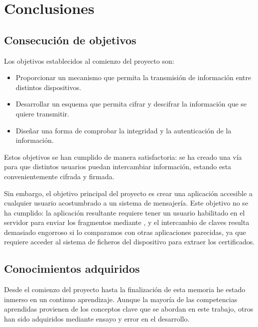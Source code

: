 
\chapter{Conclusiones} %

\label{Chapter6} %


\section{Consecución de objetivos}

Los objetivos establecidos al comienzo del proyecto son:

\begin{itemize}
  \item Proporcionar un mecanismo que permita la transmisión de información entre distintos dispositivos.
  \item Desarrollar un esquema que permita cifrar y descifrar la información que se quiere transmitir.
  \item Diseñar una forma de comprobar la integridad y la autenticación de la información.
\end{itemize}

Estos objetivos se han cumplido de manera satisfactoria: se ha creado una vía para que distintos usuarios puedan intercambiar información, estando esta convenientemente cifrada y firmada.

Sin embargo, el objetivo principal del proyecto es crear una aplicación accesible a cualquier usuario acostumbrado a un sistema de mensajería. Este objetivo no se ha cumplido: la aplicación resultante requiere tener un usuario habilitado en el servidor para enviar los fragmentos mediante , y el intercambio de claves resulta demasiado engorroso si lo comparamos con otras aplicaciones parecidas, ya que requiere acceder al sistema de ficheros del dispositivo para extraer los certificados.

\section{Conocimientos adquiridos}

Desde el comienzo del proyecto hasta la finalización de esta memoria he estado inmerso en un continuo aprendizaje. Aunque la mayoría de las competencias aprendidas provienen de los conceptos clave que se abordan en este trabajo, otros han sido adquiridos mediante ensayo y error en el desarrollo.

